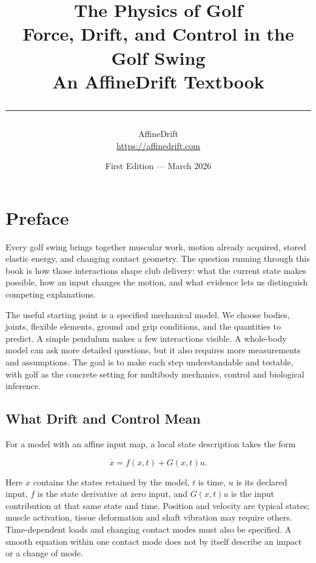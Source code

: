 \documentclass[10pt,letterpaper,openany]{book}
\title{%
  {\Huge\bfseries\color{chapblue} The Physics of Golf}\\[0.4cm]
  {\Large Force, Drift, and Control in the Golf Swing}\\[0.3cm]
  {\large An AffineDrift Textbook}\\[0.6cm]
  {\color{chapblue}\rule{\textwidth}{2pt}}
}
\author{{\large AffineDrift}\\[0.2cm]{\normalsize\url{https://affinedrift.com}}}
\date{{\normalsize First Edition --- March 2026}}
\theoremstyle{plain}
\begin{document}
\maketitle
\thispagestyle{empty}
\cleardoublepage

\frontmatter

\chapter*{Preface}

Every golf swing brings together muscular work, motion already acquired, stored elastic energy, and changing contact geometry. The question running through this book is how those interactions shape club delivery: what the current state makes possible, how an input changes the motion, and what evidence lets us distinguish competing explanations.

\label{scope}{}

The useful starting point is a specified mechanical model. We choose bodies, joints, flexible elements, ground and grip conditions, and the quantities to predict. A simple pendulum makes a few interactions visible. A whole-body model can ask more detailed questions, but it also requires more measurements and assumptions. The goal is to make each step understandable and testable, with golf as the concrete setting for multibody mechanics, control and biological inference.

\section*{What Drift and Control Mean}\label{central-analytical-idea}

For a model with an affine input map, a local state description takes the form

\[
\dot x=f(x,t)+G(x,t)u.
\]

Here \(x\) contains the states retained by the model, \(t\) is time, \(u\) is its declared input, \(f\) is the state derivative at zero input, and \(G(x,t)u\) is the input contribution at that same state and time. Position and velocity are typical states; muscle activation, tissue deformation and shaft vibration may require others. Time-dependent loads and changing contact modes must also be specified. A smooth equation within one contact mode does not by itself describe an impact or a change of mode.
\end{document}
